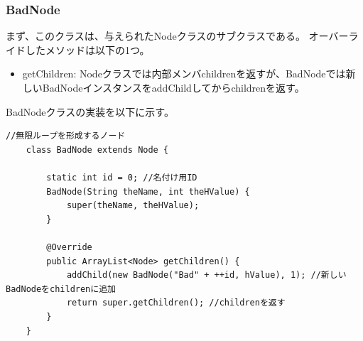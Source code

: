 \documentclass{jarticle}
\begin{document}
\subsubsection{BadNode}

まず、このクラスは、与えられたNodeクラスのサブクラスである。
オーバーライドしたメソッドは以下の1つ。
\begin{itemize}
\item getChildren: Nodeクラスでは内部メンバchildrenを返すが、BadNodeでは新しいBadNodeインスタンスをaddChildしてからchildrenを返す。

\end{itemize}

BadNodeクラスの実装を以下に示す。
\begin{lstlisting}[caption=BadNodeクラス,label=src:BadNode]
    //無限ループを形成するノード
    class BadNode extends Node {

        static int id = 0; //名付け用ID
        BadNode(String theName, int theHValue) {
            super(theName, theHValue);
        }

        @Override
        public ArrayList<Node> getChildren() {
            addChild(new BadNode("Bad" + ++id, hValue), 1); //新しいBadNodeをchildrenに追加
            return super.getChildren(); //childrenを返す
        }
    }
\end{lstlisting}
\end{document}
